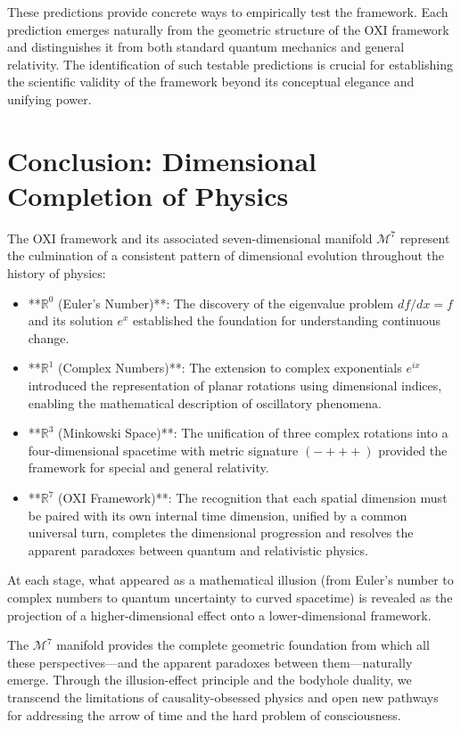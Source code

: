 \documentclass{article}
\begin{document}
These predictions provide concrete ways to empirically test the framework. Each prediction emerges naturally from the geometric structure of the OXI framework and distinguishes it from both standard quantum mechanics and general relativity. The identification of such testable predictions is crucial for establishing the scientific validity of the framework beyond its conceptual elegance and unifying power.

\section{Conclusion: Dimensional Completion of Physics}

The OXI framework and its associated seven-dimensional manifold $\mathcal{M}^7$ represent the culmination of a consistent pattern of dimensional evolution throughout the history of physics:

\begin{itemize}
\item **$\mathbb{R}^0$ (Euler's Number)**: The discovery of the eigenvalue problem $df/dx = f$ and its solution $e^x$ established the foundation for understanding continuous change.

\item **$\mathbb{R}^1$ (Complex Numbers)**: The extension to complex exponentials $e^{ix}$ introduced the representation of planar rotations using dimensional indices, enabling the mathematical description of oscillatory phenomena.

\item **$\mathbb{R}^3$ (Minkowski Space)**: The unification of three complex rotations into a four-dimensional spacetime with metric signature $(-+++)$ provided the framework for special and general relativity.

\item **$\mathbb{R}^7$ (OXI Framework)**: The recognition that each spatial dimension must be paired with its own internal time dimension, unified by a common universal turn, completes the dimensional progression and resolves the apparent paradoxes between quantum and relativistic physics.
\end{itemize}

At each stage, what appeared as a mathematical illusion (from Euler's number to complex numbers to quantum uncertainty to curved spacetime) is revealed as the projection of a higher-dimensional effect onto a lower-dimensional framework. 

The $\mathcal{M}^7$ manifold provides the complete geometric foundation from which all these perspectives—and the apparent paradoxes between them—naturally emerge. Through the illusion-effect principle and the bodyhole duality, we transcend the limitations of causality-obsessed physics and open new pathways for addressing the arrow of time and the hard problem of consciousness.
\end{document}
